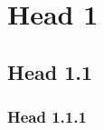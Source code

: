 
\section{Head 1}
\label{sec:head1}

\subsection{Head 1.1}
\label{subsec:head11}

\subsubsection{Head 1.1.1}
\label{subsubsec:head111}

